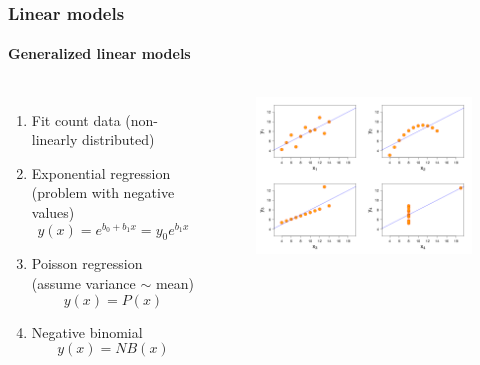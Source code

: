 \documentclass[aspectratio=43]{beamer}
\begin{document}
\begin{frame}

	\frametitle{Linear models}
	\framesubtitle{Generalized linear models}
	
	\footnotesize
	
	\begin{columns}
		
		
		\begin{enumerate}
			\item Fit count data (non-linearly distributed)
			\item Exponential regression (problem with negative values)
			\begin{equation}
				y(x) = e^{b_{0} + b_{1}x} = y_{0}e^{b_{1}x} \nonumber
			\end{equation}
			\item Poisson regression (assume variance $\sim$ mean)
			\begin{equation}
				y(x) = P(x) \nonumber
			\end{equation}
			\item Negative binomial
			\begin{equation}
				y(x) = NB(x) \nonumber
			\end{equation}
		\end{enumerate}
		
		
		\begin{figure}[!htb]
			\includegraphics[width = \linewidth]{plots/part2/linear_model.png}
		\end{figure}
		
	\end{columns}

\end{frame}
\end{document}
